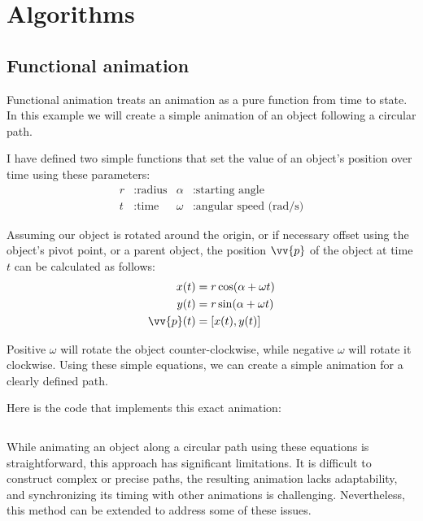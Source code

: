 \pagebreak

\section{Algorithms}
\label{sec:algorithms}

\subsection{Functional animation}
\label{subsec:functional-animation}

Functional animation treats an animation as a pure function from time to state. In this example we will create a simple animation of an object following a circular path.


I have defined two simple functions that set the value of an object's position over time using these parameters:
\begin{align*}
    r &: \text{radius} & \alpha &: \text{starting angle} \\
    t &: \text{time} & \omega &: \text{angular speed (rad/s)}
\end{align*}

Assuming our object is rotated around the origin, or if necessary offset using the object's pivot point, or a parent object, the position \(\vv{p}\) of the object at time \(t\) can be calculated as follows:
\begin{align*}
    x(t) &= r\cos(\alpha + \omega t) \\
    y(t) &= r\sin(\alpha + \omega t) \\
    \vv{p}(t) &= [x(t), y(t)]
\end{align*}

Positive \(\omega\) will rotate the object counter-clockwise, while negative \(\omega\) will rotate it clockwise. Using these simple equations, we can create a simple animation for a clearly defined path.

Here is the code that implements this exact animation:
\inputminted{typescript}{code/functional-animation.tex}

While animating an object along a circular path using these equations is straightforward, this approach has significant limitations. It is difficult to construct complex or precise paths, the resulting animation lacks adaptability, and synchronizing its timing with other animations is challenging. Nevertheless, this method can be extended to address some of these issues.

